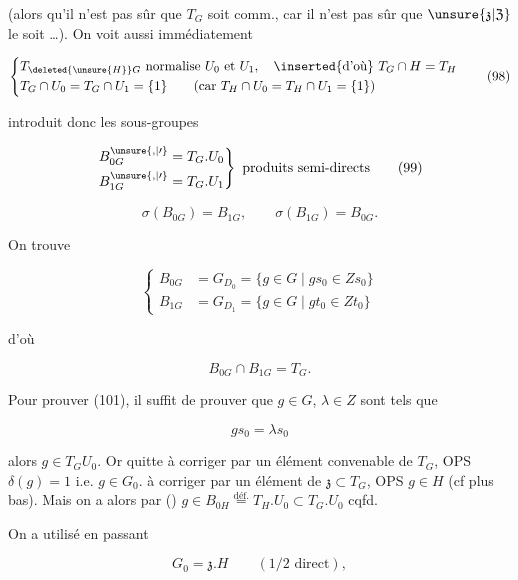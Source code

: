 

(alors qu'il n'est pas sûr que  $T_G$ soit comm., car il n'est pas sûr que $\unsure{\mathfrak{z}|\mathfrak{Z}}$ le soit \ldots). On voit aussi immédiatement

\[\left\{\begin{aligned}
&T_{\deleted{\unsure{H}}G}\text{ normalise }U_0\text{ et }U_1,\quad \inserted{\text{d'où}}\ T_G\cap H=T_H\\
&T_G\cap U_0=T_G\cap U_1=\{1\}\qquad(\text{car }T_H\cap U_0=T_H\cap U_1=\{1\})
\end{aligned}\right.\tag*{(98)}\]

 introduit donc les sous-groupes

\[\left.\begin{aligned}
B_{0G}^{\unsure{,|\prime}}&=T_G.U_0\\
B_{1G}^{\unsure{,|\prime}}&=T_G.U_1
\end{aligned}\right\}\text{ produits semi-directs}\tag*{(99)}\]


\[\sigma(B_{0G})=B_{1G},\qquad \sigma(B_{1G})=B_{0G}.\tag*{(100)}\]

On trouve

\[\left\{\begin{aligned}
B_{0G}&=G_{D_0}=\{g\in G\mid gs_0\in Zs_0\}\\
B_{1G}&=G_{D_1}=\{g\in G\mid gt_0\in Zt_0\}
\end{aligned}\right.\tag*{(101)}\]

d'où

\[B_{0G}\cap B_{1G}=T_G.\tag*{(102)}\]

Pour prouver (101), il suffit de prouver que  $g\in G$,  $\lambda\in Z$ sont tels que

\[gs_0=\lambda s_0\]

alors $g\in T_G U_0$. Or quitte à corriger  par un élément convenable de $T_G$, OPS $\delta(g)=1$ i.e. $g\in G_0$.   à corriger par un élément de $\mathfrak{z}\subset T_G$, OPS $g\in H$ (cf plus bas). Mais on a alors par () $g\in B_{0H}\overset{\mathrm{déf}.}{=}T_H.U_0\subset T_G.U_0$ cqfd.

On a utilisé en passant

\[G_0=\mathfrak{z}.H\qquad (1/2\text{ direct}),\tag*{(103)}\]


